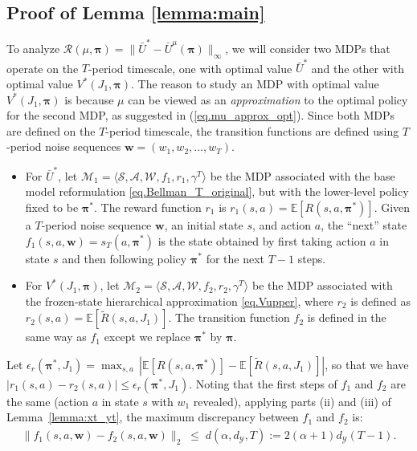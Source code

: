 \documentclass[11pt, notitlepage]{article}
\newcommand{\E}{\mathbb{E}}
\newcommand{\1}{\mathbbm{1}}
\begin{document}
\subsection{Proof of Lemma \ref{lemma:main}}
\label{sec:proof_lemma_main}
To analyze $\mathcal R(\mu, \boldsymbol{\pi}) = \|\bar{U}^* - \bar{U}^{\mu}(\boldsymbol{\pi})\|_\infty$, we will consider two MDPs that operate on the $T$-period timescale, one with optimal value $\bar{U}^*$ and the other with optimal value $V^*(J_1, \boldsymbol{\pi})$. The reason to study an MDP with optimal value $V^*(J_1, \boldsymbol{\pi})$ is because $\mu$ can be viewed as an \emph{approximation} to the optimal policy for the second MDP, as suggested in (\ref{eq.mu_approx_opt}). Since both MDPs are defined on the $T$-period timescale, the transition functions are defined using $T$-period noise sequences $\boldsymbol{w} = (w_1,w_2,\ldots,w_{T})$. 
\begin{itemize}
    \item For $\bar{U}^*$, let $\mathcal M_1 = \langle \mathcal{S}, \mathcal{A}, \mathcal{W}, f_1, r_1, \gamma^T \rangle$ be the MDP associated with the base model reformulation \eqref{eq.Bellman_T_original}, but with the lower-level policy fixed to be $\boldsymbol{\pi}^*$. The reward function $r_1$ is $r_1(s,a) = \E [R(s, a, \boldsymbol{\pi}^*)]$. Given a $T$-period noise sequence $\boldsymbol{w}$, an initial state $s$, and action $a$, the ``next'' state $f_1(s,a,\boldsymbol{w})=s_T(a, \boldsymbol{\pi}^*)$ is the state obtained by first taking action $a$ in state $s$ and then following policy $\boldsymbol{\pi}^*$ for the next $T-1$ steps.
    \item For $V^*(J_1, \boldsymbol{\pi})$, let $\mathcal M_2 = \langle \mathcal{S}, \mathcal{A}, \mathcal{W}, f_2, r_2, \gamma^T \rangle$ be the MDP associated with the frozen-state hierarchical approximation \eqref{eq.Vupper}, where $r_2$ is defined as $r_2(s,a) = \E [\tilde{R}(s, a, J_1)]$. The transition function $f_2$ is defined in the same way as $f_1$ except we replace $\boldsymbol{\pi}^*$ by $\boldsymbol{\pi}$.
\end{itemize}
Let $\epsilon_r(\boldsymbol{\pi}^*, J_1) = \max_{s,a} \, |\E [R(s, a, \boldsymbol{\pi}^*)] - \E [\tilde{R}(s, a, J_1)]|$, so that we have $|r_1(s,a) - r_2(s,a)| \leq \epsilon_r(\boldsymbol{\pi}^*, J_1)$.
Noting that the first steps of $f_1$ and $f_2$ are the same (action $a$ in state $s$ with $w_1$ revealed), applying parts (ii) and (iii) of Lemma~\ref{lemma:xt_yt}, the maximum discrepancy between $f_1$ and $f_2$ is:
    \begin{align*}
        \|f_1(s,a,\boldsymbol{w}) - f_2(s,a,\boldsymbol{w})\|_2 \; \leq \; d(\alpha,d_\mathcal{Y},T) := 2 (\alpha+1) d_\mathcal{Y} (T-1).
    \end{align*}
\end{document}
